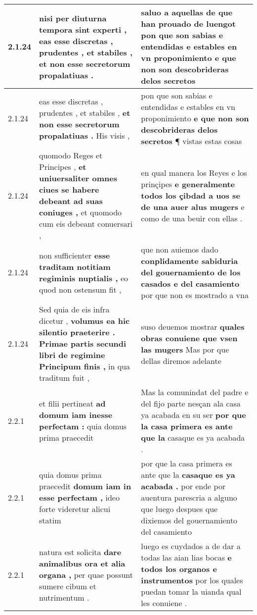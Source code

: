 \begin{tabular}{|p{1cm}|p{6.5cm}|p{6.5cm}|}
2.1.24 & nisi per diuturna tempora sint experti , \textbf{ eas esse discretas , prudentes , et stabiles , } et non esse secretorum propalatiuas . & saluo a aquellas de que han prouado de luengot \textbf{ pon que son sabias e entendidas e estables en vn proponimiento } e que non son descobrideras delos secretos \\\hline
2.1.24 & eas esse discretas , prudentes , et stabiles , \textbf{ et non esse secretorum propalatiuas . } His visis , & pon que son sabias e entendidas e estables en vn proponimiento \textbf{ e que non son descobrideras delos secretos } ¶ vistas estas cosas \\\hline
2.1.24 & quomodo Reges et Principes , \textbf{ et uniuersaliter omnes ciues se habere debeant ad suas coniuges , } et quomodo cum eis debeant conuersari , & en qual manera los Reyes e los prinçipes \textbf{ e generalmente todos los çibdad a uos se de una auer alus mugers } e como de una beuir con ellas . \\\hline
2.1.24 & non sufficienter \textbf{ esse traditam notitiam regiminis nuptialis , } eo quod non ostensum fit , & que non auiemos dado \textbf{ conplidamente sabiduria del gouernamiento de los casados e del casamiento } por que non es mostrado a vna \\\hline
2.1.24 & Sed quia de eis infra dicetur , \textbf{ volumus ea hic silentio praeterire . Primae partis secundi libri de regimine Principum finis , } in qua traditum fuit , & suso deuemos mostrar \textbf{ quales obras conuiene que vsen las mugers } Mas por que dellas diremos adelante \\\hline
2.2.1 & et filii pertineat \textbf{ ad domum iam inesse perfectam : } quia domus prima praecedit & Mas la comunindat del padre e del fijo parte nesçan ala casa ya acabada en su ser \textbf{ por que la casa primera es ante que la } casaque es ya acabada . \\\hline
2.2.1 & quia domus prima praecedit \textbf{ domum iam in esse perfectam , } ideo forte videretur alicui statim & por que la casa primera es ante que la \textbf{ casaque es ya acabada . } por ende por auentura parescria a alguno que luego despues que dixiemos del gouernamiento del casamiento \\\hline
2.2.1 & natura est solicita \textbf{ dare animalibus ora et alia organa , } per quae possunt sumere cibum et nutrimentum . & luego es cuydados a de dar a todas las aian lias bocas \textbf{ e todos los organos e instrumentos } por los quales puedan tomar la uianda qual les conuiene . \\\hline

\end{tabular}
